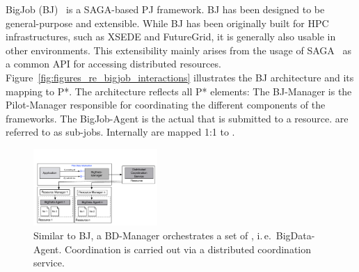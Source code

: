 \documentclass[conference]{IEEEtran}
\begin{document}



BigJob (BJ)~\cite{bigjob_web,saga_bigjob_condor_cloud_short} is a SAGA-based PJ
framework. BJ has been designed to be general-purpose and extensible. While BJ
has been originally built for HPC infrastructures, such as XSEDE and
FutureGrid, it is generally also usable in other environments. This
extensibility mainly arises from the usage of SAGA~\cite{saga_url,ogf-gfd-90} 
as a common API for accessing distributed resources. 
Figure~\ref{fig:figures_re_bigjob_interactions} illustrates the
BJ architecture and its mapping to P*. The architecture reflects
all P* elements: The BJ-Manager is the Pilot-Manager responsible for
coordinating the different components of the frameworks. The
BigJob-Agent is the actual \pilot that is submitted to a
resource. \cus are referred to as sub-jobs. Internally \cus are mapped
1:1 to \sus.


\begin{figure}[t]
	\up\up\upp
	\centering
	\includegraphics[width=0.42\textwidth]{../figures/bigdata_pmr.pdf}
	\caption{ Similar to BJ, a BD-Manager orchestrates a set of \pilots, i.\,e.\ BigData-Agent. Coordination is carried out via a distributed coordination service. \up\up }
	\label{fig:bigdata}
\end{figure}
\end{document}
